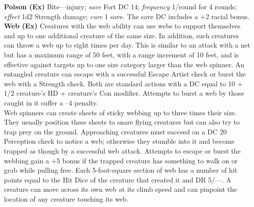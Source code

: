 \textbf{Poison (Ex)} Bite---injury; \emph{save} Fort DC 14; \emph{frequency} 1/round for 4 rounds; \\ \emph{effect} 1d2 Strength damage; \emph{cure} 1 save. The save DC includes a +2 racial bonus. \\

\textbf{Web (Ex)} Creatures with the web ability can use webs to support themselves and up to one additional creature of the same size. In addition, such creatures can throw a web up to eight times per day. This is similar to an attack with a net but has a maximum range of 50 feet, with a range increment of 10 feet, and is effective against targets up to one size category larger than the web spinner. An entangled creature can escape with a successful Escape Artist check or burst the web with a Strength check. Both are standard actions with a DC equal to 10 + 1/2 creature’s HD + creature’s Con modifier. Attempts to burst a web by those caught in it suffer a –4 penalty. \\

Web spinners can create sheets of sticky webbing up to three times their size. They usually position these sheets to snare flying creatures but can also try to trap prey on the ground. Approaching creatures must succeed on a DC 20 Perception check to notice a web; otherwise they stumble into it and become trapped as though by a successful web attack. Attempts to escape or burst the webbing gain a +5 bonus if the trapped creature has something to walk on or grab while pulling free. Each 5-foot-square section of web has a number of hit points equal to the Hit Dice of the creature that created it and DR 5/—.
A creature can move across its own web at its climb speed and can pinpoint the location of any creature touching its web. \\

\newpage
